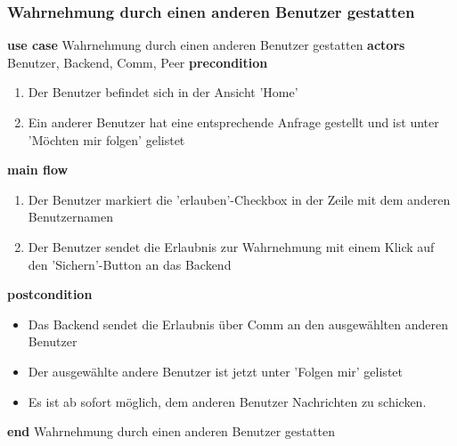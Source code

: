\subsubsection{Wahrnehmung durch einen anderen Benutzer gestatten}\label{subsubsec:uc_grantpeerfollowme}
\noindent \textbf{use case} Wahrnehmung durch einen anderen Benutzer gestatten \newline
\indent \textbf{actors} \newline
\indent \indent Benutzer, Backend, Comm, Peer \newline
\indent \textbf{precondition}
\begin{enumerate}[labelwidth=0pt,leftmargin=39pt,noitemsep,topsep=0pt,parsep=0pt,partopsep=0pt]
\item Der Benutzer befindet sich in der Ansicht 'Home'
\item Ein anderer Benutzer hat eine entsprechende Anfrage gestellt und ist unter 'Möchten mir folgen' gelistet
\end{enumerate}
\indent \indent \textbf{main flow}
\begin{enumerate}[labelwidth=0pt,leftmargin=39pt,noitemsep,topsep=0pt,parsep=0pt,partopsep=0pt]
\item Der Benutzer markiert die 'erlauben'-Checkbox in der Zeile mit dem anderen Benutzernamen
\item Der Benutzer sendet die Erlaubnis zur Wahrnehmung mit einem Klick auf den 'Sichern'-Button an das Backend
\end{enumerate}
\indent \indent \textbf{postcondition}
\begin{itemize}[labelwidth=0pt,leftmargin=39pt,noitemsep,topsep=0pt,parsep=0pt,partopsep=0pt]
\item Das Backend sendet die Erlaubnis über Comm an den ausgewählten anderen Benutzer
\item Der ausgewählte andere Benutzer ist jetzt unter 'Folgen mir' gelistet
\item Es ist ab sofort möglich, dem anderen Benutzer Nachrichten zu schicken.
\end{itemize}
\noindent \textbf{end} Wahrnehmung durch einen anderen Benutzer gestatten \newline

